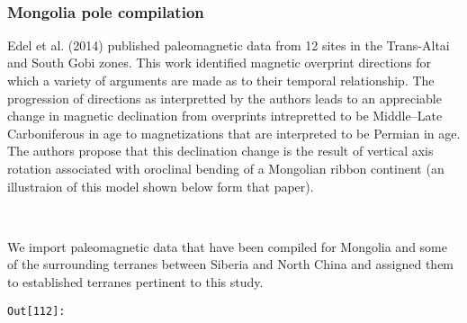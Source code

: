 \documentclass[11pt]{article}
\begin{document}
    \begin{center}
    \end{center}
    { \hspace*{\fill} \\}
    
    \subsubsection{Mongolia pole
compilation}\label{mongolia-pole-compilation}

    Edel et al. (2014) published paleomagnetic data from 12 sites in the
Trans-Altai and South Gobi zones. This work identified magnetic
overprint directions for which a variety of arguments are made as to
their temporal relationship. The progression of directions as
interpretted by the authors leads to an appreciable change in magnetic
declination from overprints intrepretted to be Middle--Late
Carboniferous in age to magnetizations that are interpreted to be
Permian in age. The authors propose that this declination change is the
result of vertical axis rotation associated with oroclinal bending of a
Mongolian ribbon continent (an illustraion of this model shown below
form that paper).


    \begin{center}
    \end{center}
    { \hspace*{\fill} \\}
    
    We import paleomagnetic data that have been compiled for Mongolia and
some of the surrounding terranes between Siberia and North China and
assigned them to established terranes pertinent to this study.

\texttt{\color{outcolor}Out[{\color{outcolor}112}]:}
    
\end{document}
